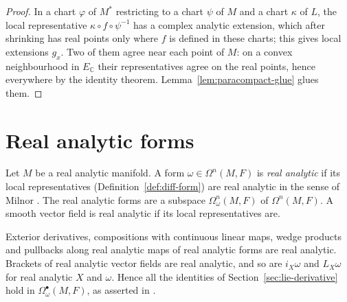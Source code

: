 \begin{proof}
  \leanok
  In a chart $\varphi$ of $M^*$ restricting to a chart $\psi$ of $M$ and a chart $\kappa$ of $L$,
  the local representative $\kappa \circ f \circ \psi^{-1}$ has a complex analytic extension, which
  after shrinking has real points only where $f$ is defined in these charts; this gives local
  extensions $g_x$. Two of them agree near each point of $M$: on a convex neighbourhood in
  $E_{\mathbb{C}}$ their representatives agree on the real points, hence everywhere by the identity
  theorem. Lemma~\ref{lem:paracompact-glue} glues them.
\end{proof}

\section{Real analytic forms}

\begin{definition}
  \label{def:analytic-forms}
  \leanok
  Let $M$ be a real analytic manifold. A form $\omega \in \Omega^n(M, F)$ is \emph{real
  analytic} if its local representatives (Definition~\ref{def:diff-form}) are real analytic in
  the sense of Milnor \cite[Remark~3.6.18]{GN26}. The real analytic forms are a subspace
  $\Omega^n_\omega(M, F)$ of $\Omega^n(M, F)$. A smooth vector field is real analytic if its local
  representatives are.
\end{definition}

\begin{theorem}
  \label{thm:analytic-forms}
  \leanok
  Exterior derivatives, compositions with continuous linear maps, wedge products and pullbacks
  along real analytic maps of real analytic forms are real analytic. Brackets of real analytic
  vector fields are real analytic, and so are $i_X\omega$ and $L_X\omega$ for real analytic $X$
  and $\omega$. Hence all the identities of Section~\ref{sec:lie-derivative} hold in
  $\Omega^\bullet_\omega(M, F)$, as asserted in \cite[Remark~3.6.18]{GN26}.
\end{theorem}

